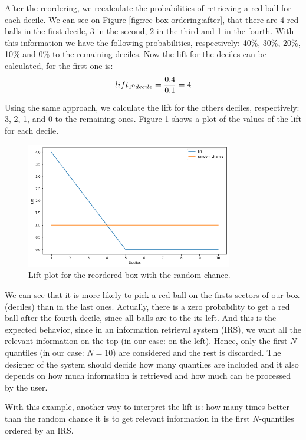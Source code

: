 After the reordering, we recalculate the probabilities of retrieving a red ball for each decile. We can see on Figure \ref{fig:rec-box-ordering:after}, that there are 4 red balls in the first decile, 3 in the second, 2 in the third and 1 in the fourth. With this information we have the following probabilities, respectively: 40\%, 30\%, 20\%, 10\% and 0\% to the remaining deciles. Now the lift for the deciles can be calculated, for the first one is:
\begin{equation}
	lift_{1\textsuperscript{o} decile} = \frac{0.4}{0.1} = 4
\end{equation}

Using the same approach, we calculate the lift for the others deciles, respectively: 3, 2, 1, and 0 to the remaining ones. Figure \ref{fig:lift-plot} shows a plot of the values of the lift for each decile.

\begin{figure}[h]
   \centering
   \includegraphics[width=9cm]{fig/ch2-lift-plot.png}
   \caption{Lift plot for the reordered box with the random chance.}
   \label{fig:lift-plot}
\end{figure}

We can see that it is more likely to pick a red ball on the firsts sectors of our box (deciles) than in the last ones. Actually, there is a zero probability to get a red ball after the fourth decile, since all balls are to the its left. And this is the expected behavior, since in an information retrieval system (IRS), we want all the relevant information on the top (in our case: on the left). Hence, only the first $N$-quantiles (in our case: $N = 10$) are considered and the rest is discarded. The designer of the system should decide how many quantiles are included and it also depends on how much information is retrieved and how much can be processed by the user.

With this example, another way to interpret the lift is: how many times better than the random chance it is to get relevant information in the first $N$-quantiles ordered by an IRS.

